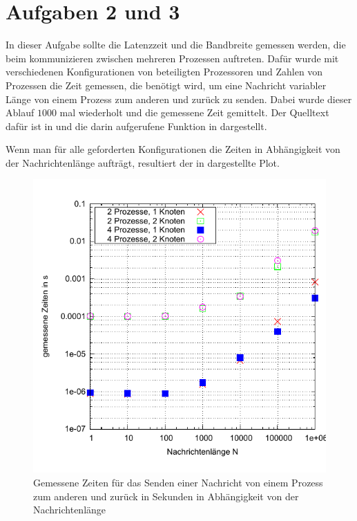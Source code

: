 \section*{Aufgaben 2 und 3}
In dieser Aufgabe sollte die Latenzzeit und die Bandbreite gemessen werden, die
beim kommunizieren zwischen mehreren Prozessen auftreten. Dafür wurde mit verschiedenen
Konfigurationen von beteiligten Prozessoren und Zahlen von Prozessen die Zeit gemessen,
die benötigt wird, um eine Nachricht variabler Länge von einem Prozess zum anderen
und zurück zu senden. Dabei wurde dieser Ablauf $1000$ mal wiederholt und die 
gemessene Zeit gemittelt. Der Quelltext dafür ist in  und die darin
aufgerufene Funktion in  dargestellt.




Wenn man für alle geforderten Konfigurationen die Zeiten in Abhängigkeit von der
Nachrichtenlänge aufträgt, resultiert der in  dargestellte Plot.

\begin{figure}[htb]
  \centering
  \includegraphics[width=1\columnwidth,keepaspectratio]{../tmp/zeiten}
  \caption{Gemessene Zeiten für das Senden einer Nachricht von einem Prozess zum
  anderen und zurück in Sekunden in Abhängigkeit von der Nachrichtenlänge}
  \label{fig:zeiten}
\end{figure}

